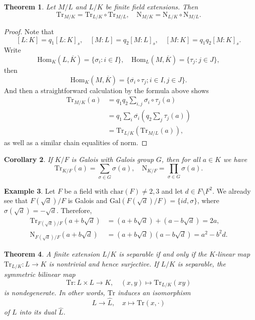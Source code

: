 \documentclass[12pt]{report}
\newtheorem{theorem}{Theorem}[section]
\newtheorem{corollary}[theorem]{Corollary}
\theoremstyle{definition}
\newtheorem{example}[theorem]{Example}
\newcommand{\charr}{\text{char}}
\newcommand{\Hom}{\text{Hom}}
\newcommand{\Gal}{\text{Gal}}
\newcommand{\Tr}{\text{Tr}}
\newcommand{\nm}{\text{N}}
\begin{document}
\begin{theorem}
	Let $M/L$ and $L/K$ be finite field extensions. Then $$\Tr_{M/K} = \Tr_{L/K}\circ\Tr_{M/L},\quad \nm_{M/K}=\nm_{L/K}\circ\nm_{M/L}.$$
\end{theorem}

\begin{proof}
	Note that $$[L:K]=q_1[L:K]_s,\quad [M:L]=q_2[M:L]_s,\quad [M:K]=q_1q_2[M:K]_s.$$ Write $$\Hom_K(L,\overline{K}) = \{\sigma_i: i \in I\},\quad \Hom_L(M,\overline{K}) = \{\tau_j: j \in J\},$$ then $$\Hom_K(M,\overline{K}) = \{\overline{\sigma_i} \circ \tau_j ; i \in I, j \in J\}.$$ And then a straightforward calculation by the formula above shows \begin{align*}
		\Tr_{M/K}(a) & =q_1q_2\sum_{i,j} \overline{\sigma_i}\circ\tau_j(a)  \\
		             & = q_1 \sum_i\overline{\sigma_i}(q_2\sum_j \tau_j(a)) \\
		             & =\Tr_{L/K}(\Tr_{M/L}(a)),
	\end{align*}
	as well as a similar chain equalities of norm.
\end{proof}

\begin{corollary}
	If $K/F$ is Galois with Galois group $G$, then for all $a\in K$ we have $$\Tr_{K/F}(a)=\sum_{\sigma\in G}\sigma(a),\quad \nm_{K/F}=\prod_{\sigma\in G}\sigma(a).$$
\end{corollary}

\begin{example}
	Let $F$ be a field with $\charr(F)\not=2,3$ and let $d\in F\setminus F^2$. We already see that $F(\sqrt{d})/F$ is Galois and $\Gal(F(\sqrt{d})/F)=\{id,\sigma\}$, where $\sigma(\sqrt{d})=-\sqrt{d}$. Therefore,
	\begin{align*}
		\Tr_{F(\sqrt{d})/F}(a+b\sqrt{d}) & =(a+b\sqrt{d})+(a-b\sqrt{d})=2a,      \\
		\nm_{F(\sqrt{d})/F}(a+b\sqrt{d}) & =(a+b\sqrt{d})(a-b\sqrt{d})=a^2-b^2d.
	\end{align*}
\end{example}

\begin{theorem}
	A finite extension $L/K$ is separable if and only if the $K$-linear map $\Tr_{L/K}: L\to K$ is nontrivial and hence surjective. If $L/K$ is separable, the symmetric bilinear map $$\Tr:L\times L\to K,\quad (x,y)\mapsto \Tr_{L/K}(xy)$$ is nondegenerate. In other words, $\Tr$ induces an isomorphism $$L\to \hat{L}, \quad x\mapsto \Tr(x,\cdot)$$ of $L$ into its dual $\hat{L}$.
\end{theorem}
\end{document}
